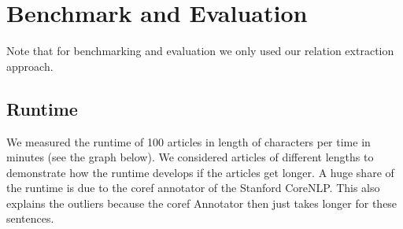 \documentclass[runningheads]{llncs}
\begin{document}
\section{Benchmark and Evaluation}
Note that for benchmarking and evaluation we only used our relation extraction approach.
\subsection{Runtime}
We measured the runtime of 100 articles in length of characters per time in minutes (see the graph below). We considered articles of different lengths to demonstrate how the runtime develops if the articles get longer. A huge share of the runtime is due to the coref annotator of the Stanford CoreNLP. This also explains the outliers because the coref Annotator then just takes longer for these sentences.

  
\end{document}
